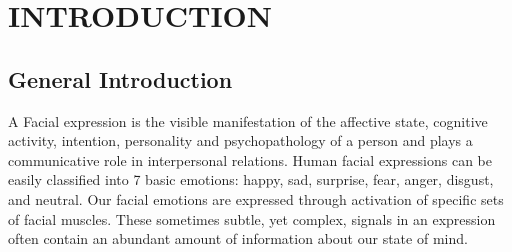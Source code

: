 \documentclass[12pt,a4paper,final]{extreport}
\begin{document}


\clearpage
{}
\chead{}
\rhead{}
\cfoot{}
\rfoot{\thepage}
\renewcommand{\headrulewidth}{0.4pt}
\renewcommand{\footrulewidth}{0.4pt}
\pagestyle{fancy}



\chapter{INTRODUCTION}
\noindent

\doublespacing
\section{General Introduction}
A Facial expression is the visible manifestation of the affective state, cognitive activity, intention, personality and psychopathology of a person and plays a communicative role in interpersonal relations. Human facial expressions can be easily classified into 7 basic emotions: happy, sad, surprise, fear, anger, disgust, and neutral. Our facial emotions are expressed through activation of specific sets of facial muscles. These sometimes subtle, yet complex, signals in an expression often contain an abundant amount of information about our state of mind.  
\end{document}
